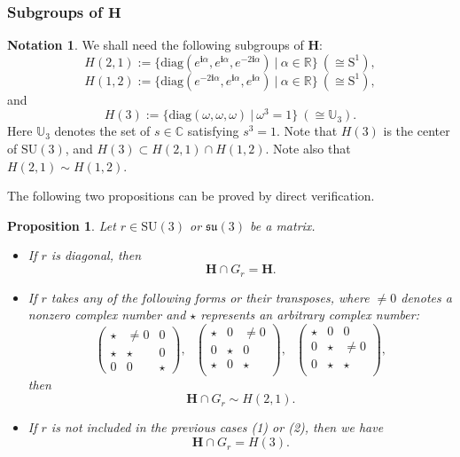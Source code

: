 \documentclass[12pt]{amsart}
\newtheorem{proposition}[theorem]{Proposition}
\theoremstyle{definition}
\newtheorem{notation}[theorem]{Notation}
\numberwithin{equation}{section}
\def\diag{\mathrm{diag}}
\newcommand{\Sone}{\mathrm{S}^1}
\newcommand{\Uthree}{\mathbb{U}_3}
\newcommand{\imagunit}{\mathbf{i}}
\newcommand{\SU}{\mathrm{SU}}
\newcommand{\su}{\mathfrak{su}}
\newcommand{\SUthree}{\SU(3)}
\newcommand{\SET}[1]{\{#1\}}
\newcommand{\Cartan}{\mathbf{H}}
\begin{document}
\subsubsection{Subgroups of $\Cartan$}
\begin{notation}
  We shall need the following subgroups of $\Cartan$:
 $$
  H(2,1):=\SET{\diag( e^{\imagunit  \alpha},e^{\imagunit  \alpha},e^{-2\imagunit  \alpha})~|~\alpha\in \mathbb{R}}~(\cong \Sone) ,
  $$
  $$
  H(1,2):=\SET{\diag( e^{-2\imagunit  \alpha},e^{\imagunit  \alpha},e^{ \imagunit  \alpha})~|~\alpha\in \mathbb{R}}~(\cong \Sone) ,
  $$
  and
   $$
  H(3):= \SET{\diag( \omega,\omega,\omega )~|~\omega^3=1}~(\cong \Uthree)  .
  $$
  Here $\Uthree$ denotes the set of $s\in \mathbb{C}$ satisfying $s^3=1$.   Note that $H(3)$ is the center of $\SUthree$, and $H(3)\subset H(2,1)\cap H(1,2)$. Note also that $H(2,1)\sim H(1,2)$. 
\end{notation}
The following two propositions can be proved by direct verification.
\begin{proposition}\label{Prop:firstandsecondmethodg0}
   Let $r\in \SUthree$ or $ \su(3)$ be a matrix. 
   \begin{itemize}
     \item[(1)]If $r$ is diagonal, then 
     $$
   \Cartan  \cap G_r = \Cartan.
     $$ 
     \item[(2)]If $r$   takes any of the following forms or their transposes, where $\neq 0$ denotes a nonzero complex number and   $\star$ represents an arbitrary complex number:
     $$
     \begin{pmatrix}
     	\star     		&   \neq 0				 &   0  \\
     	\star	    &  \star    &   0  \\
     	0					 					    &  		0								 & \star
     \end{pmatrix},\mbox{ } \begin{pmatrix}
     	\star     		& 0   				 & \neq 0  \\
     	 0					 					    &  		\star								 & 0\\
     	\star	    &    0    & \star  \\
     \end{pmatrix},\mbox{ } \begin{pmatrix}
     \star     		& 0   				 &  0  \\
     0					 					    &  	\star	& \neq 0								 \\
      0    &    \star    & \star  \\
     \end{pmatrix},
     $$ then 
     $$
     \Cartan  \cap G_r \sim H(2,1).
     $$
     \item[(3)] If $r$ is not included in the previous cases (1) or (2), then we have
     $$
     \Cartan  \cap G_r = H(3).
     $$ 
   \end{itemize}
\end{proposition}
\end{document}
